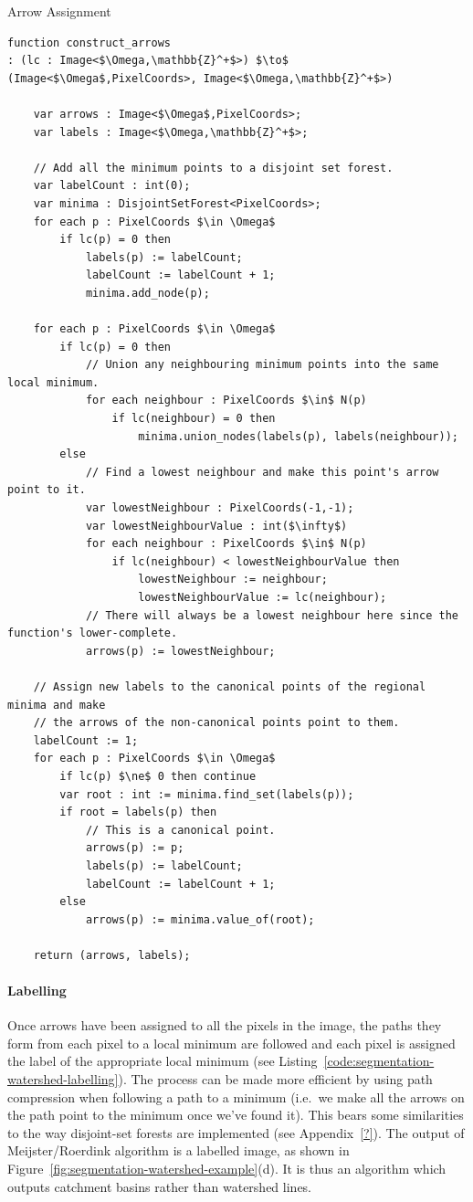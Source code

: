\begin{stulisting}[t]
\caption{Arrow Assignment}
\label{code:segmentation-watershed-arrowassignment}
\begin{lstlisting}[style=Default]
function construct_arrows
: (lc : Image<$\Omega,\mathbb{Z}^+$>) $\to$ (Image<$\Omega$,PixelCoords>, Image<$\Omega,\mathbb{Z}^+$>)

	var arrows : Image<$\Omega$,PixelCoords>;
	var labels : Image<$\Omega,\mathbb{Z}^+$>;

	// Add all the minimum points to a disjoint set forest.
	var labelCount : int(0);
	var minima : DisjointSetForest<PixelCoords>;
	for each p : PixelCoords $\in \Omega$
		if lc(p) = 0 then
			labels(p) := labelCount;
			labelCount := labelCount + 1;
			minima.add_node(p);

	for each p : PixelCoords $\in \Omega$
		if lc(p) = 0 then
			// Union any neighbouring minimum points into the same local minimum.
			for each neighbour : PixelCoords $\in$ N(p)
				if lc(neighbour) = 0 then
					minima.union_nodes(labels(p), labels(neighbour));
		else
			// Find a lowest neighbour and make this point's arrow point to it.
			var lowestNeighbour : PixelCoords(-1,-1);
			var lowestNeighbourValue : int($\infty$)
			for each neighbour : PixelCoords $\in$ N(p)
				if lc(neighbour) < lowestNeighbourValue then
					lowestNeighbour := neighbour;
					lowestNeighbourValue := lc(neighbour);
			// There will always be a lowest neighbour here since the function's lower-complete.
			arrows(p) := lowestNeighbour;

	// Assign new labels to the canonical points of the regional minima and make
	// the arrows of the non-canonical points point to them.
	labelCount := 1;
	for each p : PixelCoords $\in \Omega$
		if lc(p) $\ne$ 0 then continue
		var root : int := minima.find_set(labels(p));
		if root = labels(p) then
			// This is a canonical point.
			arrows(p) := p;
			labels(p) := labelCount;
			labelCount := labelCount + 1;
		else
			arrows(p) := minima.value_of(root);

	return (arrows, labels);
\end{lstlisting}
\end{stulisting}

\paragraph{Labelling}

Once arrows have been assigned to all the pixels in the image, the paths they form from each pixel to a local minimum are followed and each pixel is assigned the label of the appropriate local minimum (see Listing~\ref{code:segmentation-watershed-labelling}). The process can be made more efficient by using path compression when following a path to a minimum (i.e.~we make all the arrows on the path point to the minimum once we've found it). This bears some similarities to the way disjoint-set forests are implemented (see Appendix~\ref{?}). The output of Meijster/Roerdink algorithm is a labelled image, as shown in Figure~\ref{fig:segmentation-watershed-example}(d). It is thus an algorithm which outputs catchment basins rather than watershed lines.

